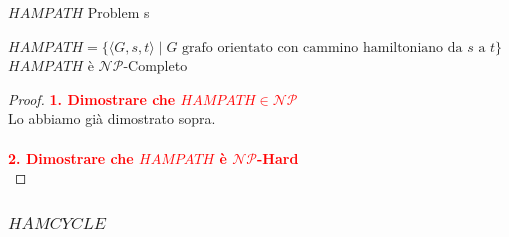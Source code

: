 \documentclass{article}  %
\theoremstyle{definition}
\begin{document}
\begin{theorem}{$HAMPATH$ Problem}
	s\footnotesize
	\begin{center}
		$HAMPATH = \{\langle G,s,t \rangle \mid G \text{ grafo orientato con cammino hamiltoniano da } s \text{ a } t\}$ \\
		$HAMPATH$ è $\mathcal{NP}$-Completo
	\end{center}
	\begin{proof}
		\textcolor{red}{\textbf{1. Dimostrare che $HAMPATH \in \mathcal{NP}$}} \\
		Lo abbiamo già dimostrato sopra. \\ \\
		\textcolor{red}{\textbf{2. Dimostrare che $HAMPATH$ è $\mathcal{NP}$-Hard}} \\
	\end{proof}
\end{theorem}
\subsubsection{$HAMCYCLE$}
\end{document}
